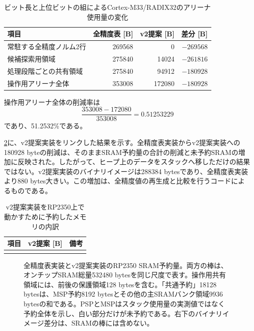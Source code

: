 \documentclass[a4paper,10pt]{ltjsarticle}
\theoremstyle{definition}
\theoremstyle{remark}
\begin{document}
\begin{table}[H]
  \centering
  \caption{ビット長と上位ビットの組によるCortex-M33/RADIX32のアリーナ使用量の変化}
  \label{tab:sketch-arena}
  \small
  \begin{tabular}{@{}lrrr@{}}
    \toprule
    項目 & 全精度表 [B] & v2提案 [B] & 差分 [B] \\
    \midrule
    常駐する全精度ノルム2行 & \num{269568} & 0 & $-\num{269568}$ \\
    候補探索用領域 & \num{275840} & \num{14024} & $-\num{261816}$ \\
    処理段階ごとの共有領域 & \num{275840} & \num{94912} & $-\num{180928}$ \\
    操作用アリーナ全体 & \num{353008} & \num{172080} & $-\num{180928}$ \\
    \bottomrule
  \end{tabular}
\end{table}

操作用アリーナ全体の削減率は
\begin{equation}
  \frac{\num{353008}-\num{172080}}{\num{353008}}
  =\num{0.51253229}
\end{equation}
であり、\num{51.2532}\%である。

\cref{tab:firmware-memory}に、v2提案実装をリンクした結果を示す。全精度表実装からv2提案実装への\num{180928} byteの削減は、そのままSRAM予約量の合計の削減と未予約SRAMの増加に反映された。したがって、ヒープ上のデータをスタックへ移しただけの結果ではない。v2提案実装のバイナリイメージは\num{288384} bytesであり、全精度表実装より\num{880} bytes大きい。この増加は、全精度値の再生成と比較を行うコードによるものである。

\begin{table}[H]
  \centering
  \caption{v2提案実装をRP2350上で動かすために予約したメモリの内訳}
  \label{tab:firmware-memory}
  \small
  \begin{tabular}{@{}lrr@{}}
    \toprule
    項目 & v2提案 [B] & 備考 \\
    \midrule
    \\
    \bottomrule
  \end{tabular}
\end{table}

\begin{figure}[H]
  \centering
  
  \caption{全精度表実装とv2提案実装のRP2350 SRAM予約量。両方の棒は、オンチップSRAM総量\num{532480} bytesを同じ尺度で表す。操作用共有領域には、前後の保護領域128 bytesを含む。「共通予約」\num{18128} bytesは、MSP予約\num{8192} bytesとその他の主SRAMバンク領域\num{9936} bytesの和である。PSPとMSPはスタック使用量の実測値ではなく予約全体を示し、白い部分だけが未予約である。右下のバイナリイメージ差分は、SRAMの棒には含めない。}
  \label{fig:memory-bars}
\end{figure}
\end{document}
